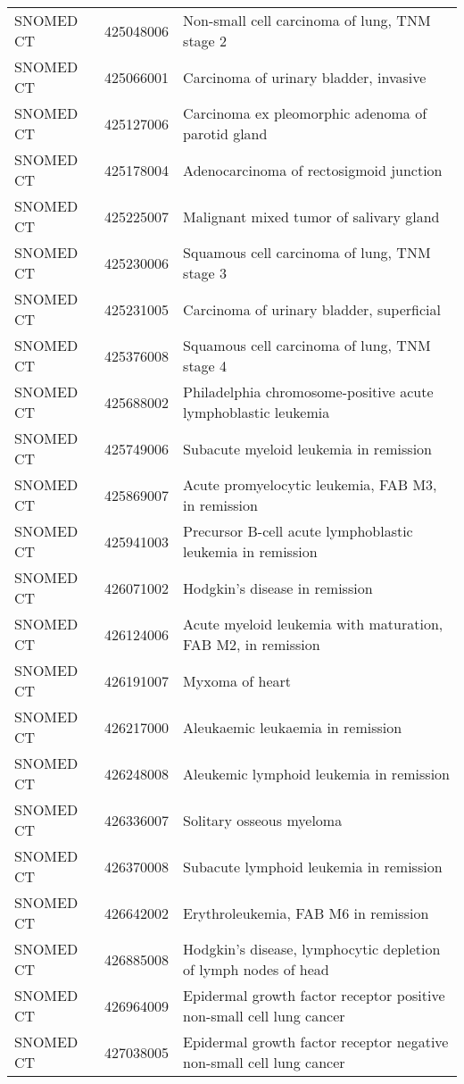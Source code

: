 \begin{longtable}{p{}p{}p{}}
  SNOMED CT & 425048006 & Non-small cell carcinoma of lung, TNM stage 2 \\ 
  SNOMED CT & 425066001 & Carcinoma of urinary bladder, invasive \\ 
  SNOMED CT & 425127006 & Carcinoma ex pleomorphic adenoma of parotid gland \\ 
  SNOMED CT & 425178004 & Adenocarcinoma of rectosigmoid junction \\ 
  SNOMED CT & 425225007 & Malignant mixed tumor of salivary gland \\ 
  SNOMED CT & 425230006 & Squamous cell carcinoma of lung, TNM stage 3 \\ 
  SNOMED CT & 425231005 & Carcinoma of urinary bladder, superficial \\ 
  SNOMED CT & 425376008 & Squamous cell carcinoma of lung, TNM stage 4 \\ 
  SNOMED CT & 425688002 & Philadelphia chromosome-positive acute lymphoblastic leukemia \\ 
  SNOMED CT & 425749006 & Subacute myeloid leukemia in remission \\ 
  SNOMED CT & 425869007 & Acute promyelocytic leukemia, FAB M3, in remission \\ 
  SNOMED CT & 425941003 & Precursor B-cell acute lymphoblastic leukemia in remission \\ 
  SNOMED CT & 426071002 & Hodgkin's disease in remission \\ 
  SNOMED CT & 426124006 & Acute myeloid leukemia with maturation, FAB M2, in remission \\ 
  SNOMED CT & 426191007 & Myxoma of heart \\ 
  SNOMED CT & 426217000 & Aleukaemic leukaemia in remission \\ 
  SNOMED CT & 426248008 & Aleukemic lymphoid leukemia in remission \\ 
  SNOMED CT & 426336007 & Solitary osseous myeloma \\ 
  SNOMED CT & 426370008 & Subacute lymphoid leukemia in remission \\ 
  SNOMED CT & 426642002 & Erythroleukemia, FAB M6 in remission \\ 
  SNOMED CT & 426885008 & Hodgkin's disease, lymphocytic depletion of lymph nodes of head \\ 
  SNOMED CT & 426964009 & Epidermal growth factor receptor positive non-small cell lung cancer \\ 
  SNOMED CT & 427038005 & Epidermal growth factor receptor negative non-small cell lung cancer \\ 

\end{longtable}
